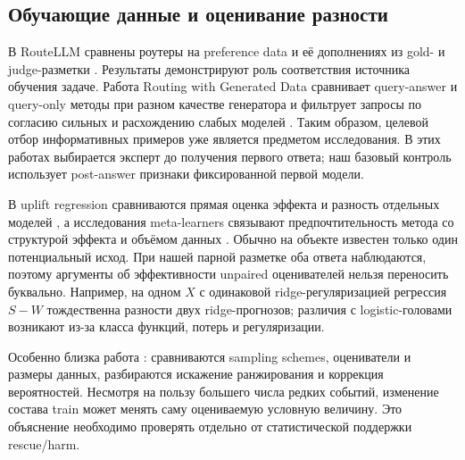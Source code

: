 \subsection{Обучающие данные и оценивание разности}
В RouteLLM сравнены роутеры на preference data и её дополнениях
из gold- и judge-разметки \citep{ong2025routellm}. Результаты
демонстрируют роль соответствия источника обучения задаче.
Работа Routing with Generated Data сравнивает query-answer
и query-only методы при разном качестве генератора и фильтрует
запросы по согласию сильных и расхождению слабых моделей
\citep{niu2026routing}. Таким образом, целевой отбор информативных
примеров уже является предметом исследования. В этих работах
выбирается эксперт до получения первого ответа; наш базовый контроль
использует post-answer признаки фиксированной первой модели.

В uplift regression сравниваются прямая оценка эффекта и разность
отдельных моделей \citep{rudas2018linear}, а исследования meta-learners
связывают предпочтительность метода со структурой эффекта и объёмом
данных \citep{kunzel2019metalearners}. Обычно на объекте известен
только один потенциальный исход. При нашей парной разметке оба
ответа наблюдаются, поэтому аргументы об эффективности unpaired
оценивателей нельзя переносить буквально. Например, на одном $X$
с одинаковой ridge-регуляризацией регрессия $S-W$ тождественна
разности двух ridge-прогнозов; различия с logistic-головами возникают
из-за класса функций, потерь и регуляризации.

Особенно близка работа \citet{nyberg2023exploring}: сравниваются
sampling schemes, оцениватели и размеры данных, разбираются
искажение ранжирования и коррекция вероятностей.
Несмотря на пользу большего числа редких событий, изменение состава
train может менять саму оцениваемую условную величину. Это объяснение
необходимо проверять отдельно от статистической поддержки rescue/harm.

